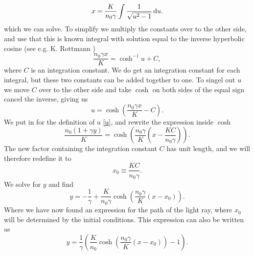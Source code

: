 \documentclass[12pt,twoside]{article}
\begin{document}
\begin{equation}
   x = \frac{K}{n_0\gamma}\int \frac{1}{\sqrt{u^2-1}} \dif u.
\end{equation}
which we can solve. To simplify we multiply the constants over to the other side, and use that this is known integral with solution equal to the inverse hyperbolic cosine (see e.g. K. Rottmann \cite{Rottmann})
\begin{equation}
   \frac{n_0\gamma x}{K} = \cosh^{-1}{u} + C,
\end{equation}
where $C$ is an integration constant. We do get an integration constant for each integral, but these two constants can be added together to one. To singel out $u$ we move $C$ over to the other side and take $\cosh{}$ on both sides of the equal sign cancel the inverse, giving us
\begin{equation}
   u = \cosh{\left(\frac{n_0\gamma x}{K}-C\right)}.
\end{equation}
We put in for the definition of $u$ \eqref{u}, and rewrite the expression inside $\cosh{}$
\begin{equation}
   \frac{n_0\left(1+\gamma y\right)}{K} = \cosh{\left(\frac{n_0\gamma}{K}\left(x-\frac{KC}{n_0\gamma}\right)\right)}.
\end{equation}
The new factor containing the integration constant $C$ has unit length, and we will therefore redefine it to
\begin{equation}
  x_0 \equiv \frac{KC}{n_0\gamma} .
\end{equation}
We solve for $y$ and find
\begin{equation}
   y = -\frac{1}{\gamma} + \frac{K}{n_0\gamma}\cosh{\left(\frac{n_0\gamma}{K}\left(x-x_0\right)\right)}.
\end{equation}
Where we have now found an expression for the path of the light ray, where $x_0$ will be determined by the initial conditions. This expression can also be written as
\begin{equation}
   y = \frac{1}{\gamma}\left(\frac{K}{n_0}\cosh{\left(\frac{n_0\gamma}{K}\left(x-x_0\right)\right)}-1\right). \label{2b}
\end{equation}
\end{document}
